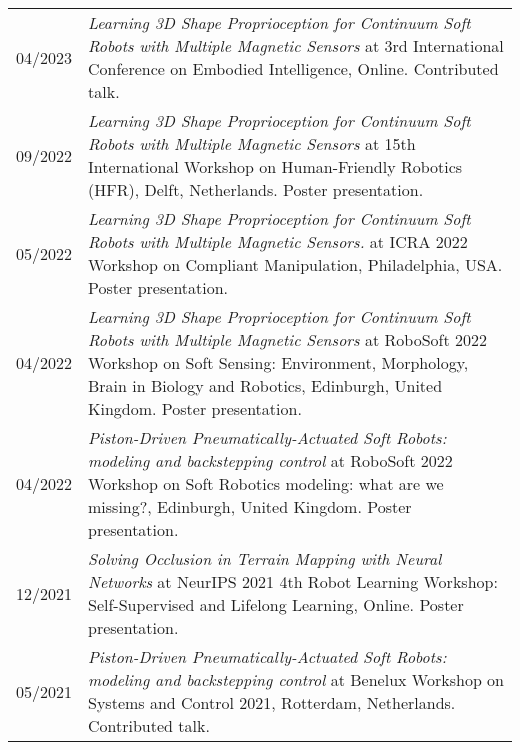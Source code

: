 \begin{longtable}{p{} p{}}
    04/2023 & \emph{Learning 3D Shape Proprioception for Continuum Soft Robots with Multiple Magnetic Sensors} at 3rd International Conference on Embodied Intelligence, Online. Contributed talk.\\
    09/2022 & \emph{Learning 3D Shape Proprioception for Continuum Soft Robots with Multiple Magnetic Sensors} at 15th International Workshop on Human-Friendly Robotics (HFR), Delft, Netherlands. Poster presentation.\\
    05/2022 & \emph{Learning 3D Shape Proprioception for Continuum Soft Robots with Multiple Magnetic Sensors.} at ICRA 2022 Workshop on Compliant Manipulation, Philadelphia, USA. Poster presentation.\\
    04/2022 & \emph{Learning 3D Shape Proprioception for Continuum Soft Robots with Multiple Magnetic Sensors} at RoboSoft 2022 Workshop on Soft Sensing: Environment, Morphology, Brain in Biology and Robotics, Edinburgh, United Kingdom. Poster presentation.\\
    04/2022 & \emph{Piston-Driven Pneumatically-Actuated Soft Robots: modeling and backstepping control} at RoboSoft 2022 Workshop on Soft Robotics modeling: what are we missing?, Edinburgh, United Kingdom. Poster presentation.\\
    12/2021 & \emph{Solving Occlusion in Terrain Mapping with Neural Networks} at NeurIPS 2021 4th Robot Learning Workshop: Self-Supervised and Lifelong Learning, Online. Poster presentation.\\
    05/2021 & \emph{Piston-Driven Pneumatically-Actuated Soft Robots: modeling and backstepping control} at Benelux Workshop on Systems and Control 2021, Rotterdam, Netherlands. Contributed talk.\\
\end{longtable}